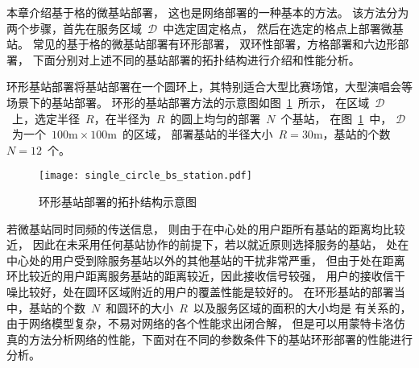 

本章介绍基于格的微基站部署，
这也是网络部署的一种基本的方法。
该方法分为两个步骤，首先在服务区域~$\mathcal{D}$~中选定固定格点，
然后在选定的格点上部署微基站。
常见的基于格的微基站部署有环形部署，
双环性部署，方格部署和六边形部署，
下面分别对上述不同的基站部署的拓扑结构进行介绍和性能分析。


环形基站部署将基站部署在一个圆环上，其特别适合大型比赛场馆，大型演唱会等场景下的基站部署。
环形的基站部署方法的示意图如图~\ref{single_circle_bs_show}~所示，
在区域~$\mathcal{D}$~上，选定半径~$R$，在半径为~$R$~的圆上均匀的部署~$N$~个基站，
在图~\ref{single_circle_bs_show}~中，
$\mathcal{D}$~为一个~$100\mathrm{m}\times 100 \mathrm{m}$~的区域，
部署基站的半径大小~$R=30\mathrm{m}$，基站的个数~$N=12$~个。
\begin{figure}[htbp]
\centering
\texttt{[image: single\_circle\_bs\_station.pdf]}
\caption{环形基站部署的拓扑结构示意图}\vspace{-0.5em}
\label{single_circle_bs_show}
\end{figure}
若微基站同时同频的传送信息，
则由于在中心处的用户距所有基站的距离均比较近，
因此在未采用任何基站协作的前提下，若以就近原则选择服务的基站，
处在中心处的用户受到除服务基站以外的其他基站的干扰非常严重，
但由于处在距离环比较近的用户距离服务基站的距离较近，因此接收信号较强，
用户的接收信干噪比较好，处在圆环区域附近的用户的覆盖性能是较好的。
在环形基站的部署当中，基站的个数~$N$~和圆环的大小~$R$~以及服务区域的面积的大小均是
有关系的，由于网络模型复杂，不易对网络的各个性能求出闭合解，
但是可以用蒙特卡洛仿真的方法分析网络的性能，下面对在不同的参数条件下的基站环形部署的性能进行分析。

